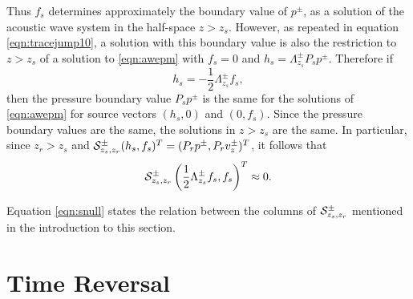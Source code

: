 \documentclass[georeport,12pt]{geophysics}
\begin{document}
Thus $f_s$ determines approximately the boundary value of $p^{\pm}$,
as a solution of the acoustic wave system in the half-space
$z>z_s$. However, as repeated in equation \ref{eqn:tracejump10}, a
solution with this boundary value is also the restriction to $z>z_s$
of a solution to \ref{eqn:awepm} with $f_s=0$ and $h_s=
\Lambda^{\pm}_{z_s}P_sp^{\pm}$. Therefore if
\begin{equation}
  \label{eqn:hfcondn}
  h_s =-\frac{1}{2}\Lambda^{\pm}_{z_s}f_s,
\end{equation}
then the pressure boundary value $P_sp^{\pm}$ is the
same for the solutions of \ref{eqn:awepm} for source vectors $(h_s,0)$
and $(0,f_s)$. Since the pressure boundary values are the same, the solutions
in $z>z_s$ are the same. In particular, since $z_r>z_s$ and ${\cal
  S}^{\pm}_{z_s,z_r}(h_s,f_s)^T = (P_rp^{\pm},P_rv^{\pm}_z)^T$, it follows
that
\begin{equation}
  \label{eqn:snull}
  {\cal S}^{\pm}_{z_s,z_r}\left(\frac{1}{2}\Lambda^{\pm}_{z_s}f_s,f_s\right)^T \approx 0.
\end{equation}

Equation \ref{eqn:snull} states the relation between the columns of $
{\cal S}^{\pm}_{z_s,z_r}$ mentioned in the introduction to this
section.


\section{Time Reversal}
\end{document}
